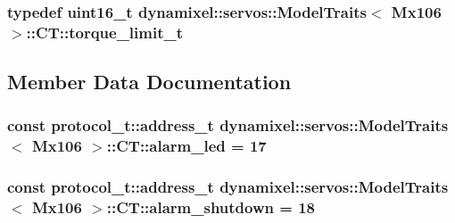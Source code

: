 \subsubsection[{\texorpdfstring{torque\+\_\+limit\+\_\+t}{torque_limit_t}}]{\setlength{\rightskip}{0pt plus 5cm}typedef uint16\+\_\+t {\bf dynamixel\+::servos\+::\+Model\+Traits}$<$ {\bf Mx106} $>$\+::{\bf C\+T\+::torque\+\_\+limit\+\_\+t}}\hypertarget{structdynamixel_1_1servos_1_1_model_traits_3_01_mx106_01_4_1_1_c_t_a4df9388d71baa1cff9d216a92def8d73}{}\label{structdynamixel_1_1servos_1_1_model_traits_3_01_mx106_01_4_1_1_c_t_a4df9388d71baa1cff9d216a92def8d73}


\subsection{Member Data Documentation}
\subsubsection[{\texorpdfstring{alarm\+\_\+led}{alarm_led}}]{\setlength{\rightskip}{0pt plus 5cm}const {\bf protocol\+\_\+t\+::address\+\_\+t} {\bf dynamixel\+::servos\+::\+Model\+Traits}$<$ {\bf Mx106} $>$\+::C\+T\+::alarm\+\_\+led = 17\hspace{0.3cm}{\ttfamily [static]}}\hypertarget{structdynamixel_1_1servos_1_1_model_traits_3_01_mx106_01_4_1_1_c_t_a5cd00a0c33fd5da1b56403bd8f2b96db}{}\label{structdynamixel_1_1servos_1_1_model_traits_3_01_mx106_01_4_1_1_c_t_a5cd00a0c33fd5da1b56403bd8f2b96db}
\subsubsection[{\texorpdfstring{alarm\+\_\+shutdown}{alarm_shutdown}}]{\setlength{\rightskip}{0pt plus 5cm}const {\bf protocol\+\_\+t\+::address\+\_\+t} {\bf dynamixel\+::servos\+::\+Model\+Traits}$<$ {\bf Mx106} $>$\+::C\+T\+::alarm\+\_\+shutdown = 18\hspace{0.3cm}{\ttfamily [static]}}\hypertarget{structdynamixel_1_1servos_1_1_model_traits_3_01_mx106_01_4_1_1_c_t_a2831c43e85bf2f6487f2a0a4ae4305bd}{}\label{structdynamixel_1_1servos_1_1_model_traits_3_01_mx106_01_4_1_1_c_t_a2831c43e85bf2f6487f2a0a4ae4305bd}
